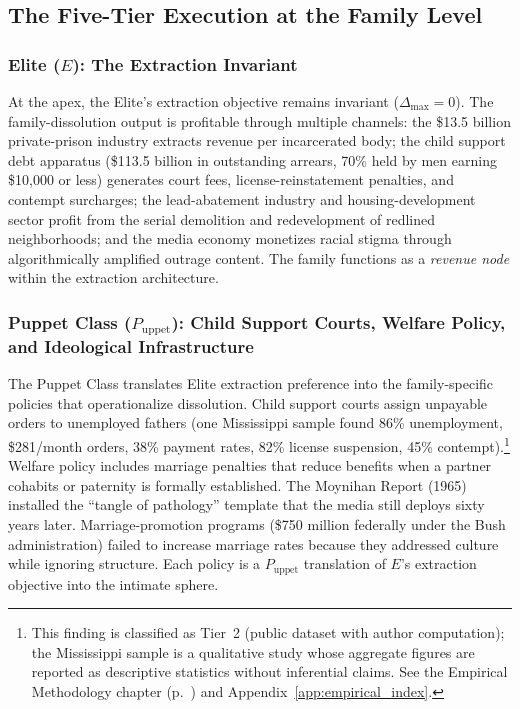 \subsection{The Five-Tier Execution at the Family Level}

\subsubsection{Elite ($E$): The Extraction Invariant}

At the apex, the Elite's extraction objective remains invariant ($\Delta_{\max} = 0$). The family-dissolution output is profitable through multiple channels: the \$13.5 billion private-prison industry extracts revenue per incarcerated body; the child support debt apparatus (\$113.5 billion in outstanding arrears, 70\% held by men earning \$10,000 or less) generates court fees, license-reinstatement penalties, and contempt surcharges; the lead-abatement industry and housing-development sector profit from the serial demolition and redevelopment of redlined neighborhoods; and the media economy monetizes racial stigma through algorithmically amplified outrage content. The family functions as a \textit{revenue node} within the extraction architecture.

\subsubsection{Puppet Class ($P_{\text{uppet}}$): Child Support Courts, Welfare Policy, and Ideological Infrastructure}

The Puppet Class translates Elite extraction preference into the family-specific policies that operationalize dissolution. Child support courts assign unpayable orders to unemployed fathers (one Mississippi sample found 86\% unemployment, \$281/month orders, 38\% payment rates, 82\% license suspension, 45\% contempt).\footnote{This finding is classified as Tier~2 (public dataset with author computation); the Mississippi sample is a qualitative study whose aggregate figures are reported as descriptive statistics without inferential claims. See the Empirical Methodology chapter (p.~\pageref{ch:empirical_methodology}) and Appendix~\ref{app:empirical_index}.} Welfare policy includes marriage penalties that reduce benefits when a partner cohabits or paternity is formally established. The Moynihan Report (1965) installed the ``tangle of pathology'' template that the media still deploys sixty years later. Marriage-promotion programs (\$750 million federally under the Bush administration) failed to increase marriage rates because they addressed culture while ignoring structure. Each policy is a $P_{\text{uppet}}$ translation of $E$'s extraction objective into the intimate sphere.

